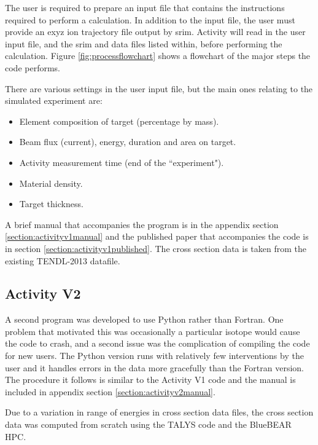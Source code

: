 The user is required to prepare an input file that contains the instructions required to perform a calculation.  In addition to the input file, the user must provide an \acrshort{exyz} ion trajectory file output by \acrshort{srim}.  Activity will read in the user input file, and the \acrshort{srim} and data files listed within, before performing the calculation.  Figure \ref{fig:processflowchart} shows a flowchart of the major steps the code performs.

There are various settings in the user input file, but the main ones relating to the simulated experiment are:

\begin{itemize}
	\item Element composition of target (percentage by mass).
	\item Beam flux (current), energy, duration and area on target.
	\item Activity measurement time (end of the ``experiment").
	\item Material density.
	\item Target thickness.
\end{itemize}

A brief manual that accompanies the program is in the appendix section \ref{section:activityv1manual} and the published paper that accompanies the code is in section \ref{section:activityv1published}.  The cross section data is taken from the existing TENDL-2013 datafile.



\subsection{Activity V2}

A second program was developed to use Python rather than Fortran.  One problem that motivated this was occasionally a particular isotope would cause the code to crash, and a second issue was the complication of compiling the code for new users.  The Python version runs with relatively few interventions by the user and it handles errors in the data more gracefully than the Fortran version.  The procedure it follows is similar to the Activity V1 code and the manual is included in appendix section \ref{section:activityv2manual}.

Due to a variation in range of energies in cross section data files, the cross section data was computed from scratch using the TALYS code and the BlueBEAR HPC.


\FloatBarrier
